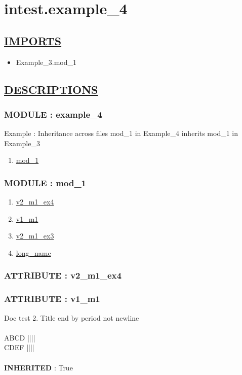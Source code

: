\chapter*{intest.example\_4}

\section*{\underline{IMPORTS}}
\begin{itemize}
\item Example\_3.mod\_1
\end{itemize}

\section*{\underline{DESCRIPTIONS}}
\subsection*{MODULE : example\_4}
\hypertarget{ecldoc:intest.example_4_intest.example_4}{}
Example : Inheritance across files mod\_1 in Example\_4 inherits mod\_1 in Example\_3 \\
\begin{enumerate}
\item \hyperlink{ecldoc:intest.example_4_intest.example_4.mod_1}{mod\_1}
\end{enumerate}
\subsection*{MODULE : mod\_1}
\hypertarget{ecldoc:intest.example_4_intest.example_4.mod_1}{}
\begin{enumerate}
\item \hyperlink{ecldoc:intest.example_4_intest.example_4.mod_1.v2_m1_ex4}{v2\_m1\_ex4}
\item \hyperlink{ecldoc:intest.example_4_example_3.mod_1.v1_m1}{v1\_m1}
\item \hyperlink{ecldoc:intest.example_4_example_3.mod_1.v2_m1_ex3}{v2\_m1\_ex3}
\item \hyperlink{ecldoc:intest.example_4_example_3.mod_1.long_name}{long\_name}
\end{enumerate}
\subsection*{ATTRIBUTE : v2\_m1\_ex4}
\hypertarget{ecldoc:intest.example_4_intest.example_4.mod_1.v2_m1_ex4}{}
\subsection*{ATTRIBUTE : v1\_m1}
\hypertarget{ecldoc:intest.example_4_example_3.mod_1.v1_m1}{}
Doc test 2. Title end by period not newline  \\
 \\
 ABCD |||| \\
 CDEF |||| \\
 \\
\textbf{INHERITED} : True \\
